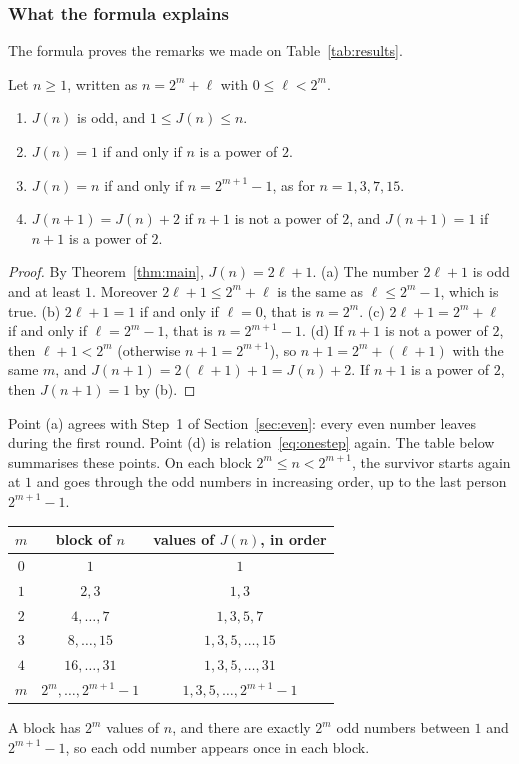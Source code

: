 \subsubsection{What the formula explains}

The formula proves the remarks we made on Table~\ref{tab:results}.

\begin{coro}\label{cor:consequences}
Let $n\geq1$, written as $n=2^m+\ell$ with $0\leq\ell<2^m$.
\begin{enumerate}
  \item[(a)] $J(n)$ is odd, and $1\leq J(n)\leq n$.
  \item[(b)] $J(n)=1$ if and only if $n$ is a power of $2$.
  \item[(c)] $J(n)=n$ if and only if $n=2^{m+1}-1$, as for $n=1,3,7,15$.
  \item[(d)] $J(n+1)=J(n)+2$ if $n+1$ is not a power of $2$, and $J(n+1)=1$
        if $n+1$ is a power of $2$.
\end{enumerate}
\end{coro}

\begin{proof}
By Theorem~\ref{thm:main}, $J(n)=2\ell+1$.
(a) The number $2\ell+1$ is odd and at least $1$. Moreover
$2\ell+1\leq2^m+\ell$ is the same as $\ell\leq2^m-1$, which is true.
(b) $2\ell+1=1$ if and only if $\ell=0$, that is $n=2^m$.
(c) $2\ell+1=2^m+\ell$ if and only if $\ell=2^m-1$, that is $n=2^{m+1}-1$.
(d) If $n+1$ is not a power of $2$, then $\ell+1<2^m$ (otherwise
$n+1=2^{m+1}$), so $n+1=2^m+(\ell+1)$ with the same $m$, and
$J(n+1)=2(\ell+1)+1=J(n)+2$. If $n+1$ is a power of $2$, then $J(n+1)=1$ by
(b).
\end{proof}

Point (a) agrees with Step~1 of Section~\ref{sec:even}: every even number
leaves during the first round. Point (d) is relation~\eqref{eq:onestep} again.
The table below summarises these points. On each block $2^m\leq n<2^{m+1}$,
the survivor starts again at $1$ and goes through the odd numbers in
increasing order, up to the last person $2^{m+1}-1$.
\begin{center}
\renewcommand{\arraystretch}{1.2}
\begin{tabular}{|c|c|c|}
\hline
$m$ & block of $n$ & values of $J(n)$, in order\\ \hline
$0$ & $1$ & $1$\\
$1$ & $2,3$ & $1,3$\\
$2$ & $4,\dots,7$ & $1,3,5,7$\\
$3$ & $8,\dots,15$ & $1,3,5,\dots,15$\\
$4$ & $16,\dots,31$ & $1,3,5,\dots,31$\\ \hline
$m$ & $2^m,\dots,2^{m+1}-1$ & $1,3,5,\dots,2^{m+1}-1$\\ \hline
\end{tabular}
\end{center}
A block has $2^m$ values of $n$, and there are exactly $2^m$ odd numbers
between $1$ and $2^{m+1}-1$, so each odd number appears once in each block.

